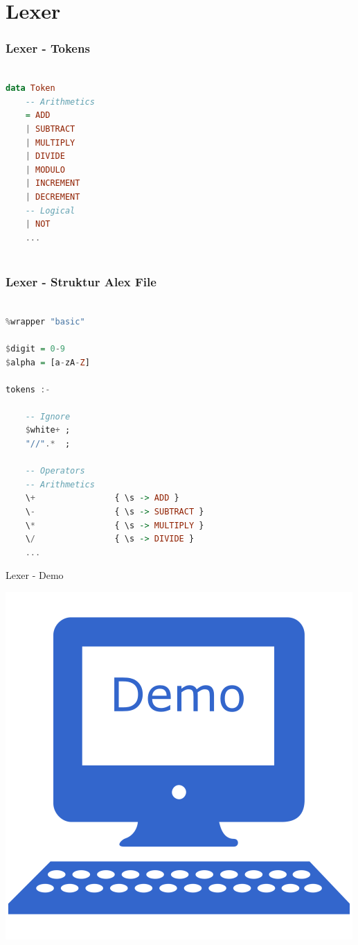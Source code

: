 \section{Lexer}

\begin{frame}[fragile]
	\frametitle{Lexer - Tokens}
	\begin{lstlisting}[language=Haskell]
		
data Token
	-- Arithmetics
	= ADD
	| SUBTRACT
	| MULTIPLY
	| DIVIDE
	| MODULO
	| INCREMENT
	| DECREMENT
	-- Logical
	| NOT	
	...	
		
	\end{lstlisting}
\end{frame}

\begin{frame}[fragile]
	\frametitle{Lexer - Struktur Alex File}
	\begin{lstlisting}[basicstyle=\tiny, language=Haskell]

%wrapper "basic"

$digit = 0-9
$alpha = [a-zA-Z]

tokens :-

	-- Ignore
	$white+ ; 
	"//".*  ;
	
	-- Operators
	-- Arithmetics
	\+                { \s -> ADD }
	\-                { \s -> SUBTRACT }
	\*                { \s -> MULTIPLY }
	\/                { \s -> DIVIDE }	
	...

	\end{lstlisting}
\end{frame}

\begin{frame}{Lexer - Demo}

\begin{center}
	\includegraphics{images/lexer/demo.png}
\end{center}

\end{frame}
